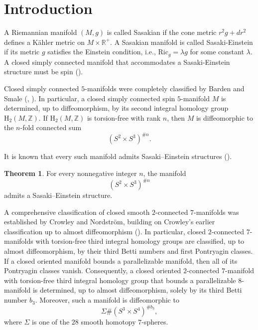 \documentclass[12pt]{amsart}
\theoremstyle{definition}
\newtheorem{theorem}[equation]{Theorem}
\theoremstyle{remark}
\begin{document}
\section{Introduction}

   
 

A Riemannian manifold $(M, g)$ is called Sasakian  if the cone metric $r^2g+ dr^2$ defines a K\"ahler metric on $M\times \mathbb{R}^+$.  
A Sasakian  manifold is called Sasaki-Einstein if its metric $g$ satisfies the Einstein condition, i.e., $\mathrm{Ric}_g=\lambda g$ for some constant $\lambda$. 
A closed simply connected manifold that accommodates a Sasaki-Einstein structure must be spin (\cite[Proposition~4.2]{Mo97}). 



Closed simply connected $5$-manifolds were completely classified by Barden and Smale (\cite{Ba65}, \cite{SM62}). In particular, a closed simply connected spin $5$-manifold $M$ is determined, up to diffeomorphism, by its second integral homology group $\mathrm{H}_2(M,\mathbb{Z})$. If $\mathrm{H}_2(M,\mathbb{Z})$ is torsion-free with rank $n$, then $M$ is diffeomorphic to the $n$-fold connected sum
\[
(S^2\times S^3)^{\#n}.
\]


It is known that every such manifold admits Sasaki--Einstein structures (\cite{Ko07}).

\begin{theorem}\label{theorem:Kollar}
For every nonnegative integer $n$, the manifold
\[
(S^2\times S^3)^{\#n}
\]
admits a Sasaki--Einstein structure.
\end{theorem}

A comprehensive classification of closed smooth $2$-connected $7$-manifolds was established by Crowley and Nordström, building on Crowley’s earlier classification up to almost diffeomorphism (\cite{Cr02,CrN19}). In particular, closed $2$-connected $7$-manifolds with torsion-free third integral homology groups are classified, up to almost diffeomorphism, by their third Betti numbers and first Pontryagin classes. If a closed oriented manifold bounds a parallelizable manifold, then all of its Pontryagin classes vanish. Consequently, a closed oriented $2$-connected $7$-manifold with torsion-free third integral homology group that bounds a parallelizable $8$-manifold is determined, up to almost diffeomorphism, solely by its third Betti number $b_3$. Moreover, such a manifold is diffeomorphic to
\[
 \Sigma\#(S^3\times S^4)^{\#b_3},
\]
where $\Sigma$ is one of the $28$ smooth homotopy $7$-spheres.
\end{document}

